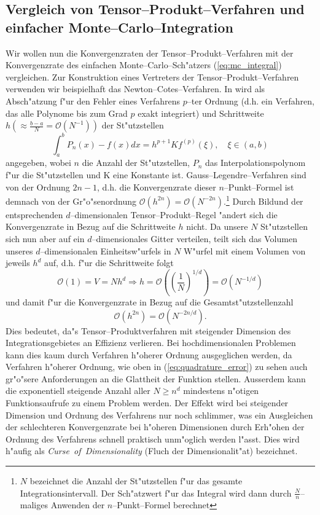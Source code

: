 	\subsection{Vergleich von Tensor--Produkt--Verfahren und einfacher Monte--Carlo--Integration}\label{subsec:integrationsproblem_comparison}
	Wir wollen nun die Konvergenzraten der Tensor--Produkt--Verfahren mit der Konvergenzrate des einfachen Monte--Carlo--Sch"atzers (\ref{eq:mc_integral}) vergleichen. Zur Konstruktion eines Vertreters der Tensor--Produkt--Verfahren verwenden wir beispielhaft das Newton--Cotes--Verfahren. In \citep[][3.1.4]{Stoer:2005p10586} wird als Ab\-sch"at\-zung f"ur den Fehler eines Verfahrens $p$--ter Ordnung (d.h. ein Verfahren, das alle Polynome bis zum Grad $p$ exakt integriert) und Schrittweite $h(\approx\frac{b-a}{N}=\mathcal{O}(N^{-1}))$ der St"utzstellen
	\begin{equation}
		\int_a^b P_n(x)-f(x)dx=h^{p+1}K f^{(p)}(\xi),\quad\xi\in(a,b)
		\label{eq:quadrature_error}
	\end{equation}
	angegeben, wobei $n$ die Anzahl der St"utzstellen, $P_n$ das Interpolationspolynom f"ur die St"utzstellen und K eine Konstante ist. Gauss--Legendre--Verfahren sind von der Ordnung $2n-1$, d.h. die Konvergenzrate dieser $n$--Punkt--Formel ist demnach von der Gr"o"senordnung $\mathcal{O}(h^{2n})=\mathcal{O}(N^{-2n})$.\footnote{$N$ bezeichnet die Anzahl der St"utzstellen f"ur das gesamte Integrationsintervall. Der Sch"atzwert f"ur das Integral wird dann durch $\frac{N}{n}$--maliges Anwenden der $n$--Punkt--Formel berechnet}
	Durch Bildund der entsprechenden $d$--dimensionalen Tensor--Produkt--Regel "andert sich die Konvergenzrate in Bezug auf die Schrittweite $h$ nicht. Da unsere $N$ St"utzstellen sich nun aber auf ein $d$--dimensionales Gitter verteilen, teilt sich das Volumen unseres $d$--dimensionalen Einheitsw"urfels in $N$ W"urfel mit einem Volumen von jeweils $h^d$ auf, d.h. f"ur die Schrittweite folgt
	$$\mathcal{O}(1)=V=N h^d \Rightarrow h=\mathcal{O}\left(\left(\frac{1}{N}\right)^{1/d}\right)=\mathcal{O}\left(N^{-1/d}\right)$$	
	und damit f"ur die Konvergenzrate in Bezug auf die Gesamtst"utzstellenzahl
	$$\mathcal{O}(h^{2n})=\mathcal{O}(N^{-2n/d}).$$
	Dies bedeutet, da"s Tensor--Produktverfahren mit steigender Dimension des Integrationsgebietes an Effizienz verlieren. Bei hochdimensionalen Problemen kann dies kaum durch Verfahren h"oherer Ordnung ausgeglichen werden, da Verfahren h"oherer Ordnung, wie oben in (\ref{eq:quadrature_error}) zu sehen auch gr"o"sere Anforderungen an die Glattheit der Funktion stellen. Ausserdem kann die exponentiell steigende Anzahl aller $N \geq n^d$ mindestens n"otigen Funktionsaufrufe zu einem Problem werden. Der Effekt wird bei steigender Dimension und Ordnung des Verfahrens nur noch schlimmer, was ein Ausgleichen der schlechteren Konvergenzrate bei h"oheren Dimensionen durch Erh"ohen der Ordnung des Verfahrens schnell praktisch unm"oglich werden l"asst. Dies wird h"aufig als {\em Curse~of~Dimensionality} (Fluch der Dimensionalit"at) bezeichnet.
	
